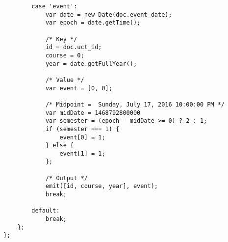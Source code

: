 \begin{verbatim}
        case 'event':
            var date = new Date(doc.event_date);
            var epoch = date.getTime();

            /* Key */
            id = doc.uct_id;
            course = 0;
            year = date.getFullYear();

            /* Value */
            var event = [0, 0];

            /* Midpoint =  Sunday, July 17, 2016 10:00:00 PM */
            var midDate = 1468792800000
            var semester = (epoch - midDate >= 0) ? 2 : 1;
            if (semester === 1) {
                event[0] = 1;
            } else {
                event[1] = 1;
            };

            /* Output */
            emit([id, course, year], event);
            break;

        default:
            break;
    };
};
\end{verbatim}